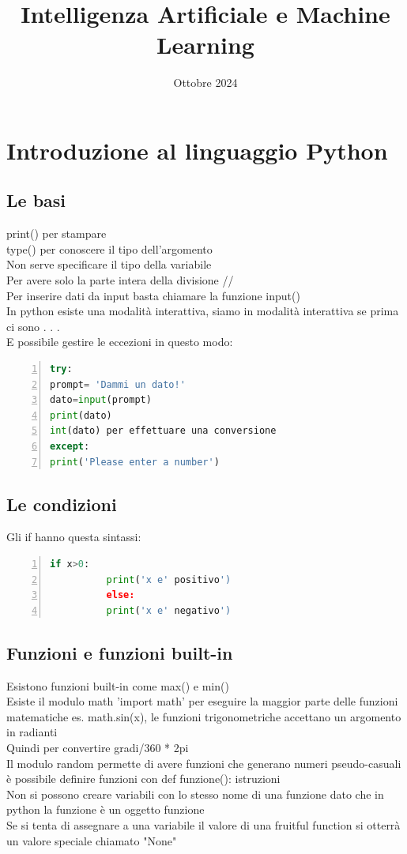\documentclass{article}
\title{Intelligenza Artificiale e Machine Learning}
\date{Ottobre 2024}
\begin{document}
\maketitle

\section{Introduzione al linguaggio Python}
\subsection{Le basi}
print() per stampare\\
           type() per conoscere il tipo dell'argomento\\
           Non serve specificare il tipo della variabile\\
           Per avere solo la parte intera della divisione //\\
           Per inserire dati da input basta chiamare la funzione input()\\
           In python esiste una modalità interattiva, siamo in modalità interattiva se prima ci sono . . .\\
           E possibile gestire le eccezioni in questo modo:
           \begin{lstlisting}[language=Python, frame=single, numbers=left, caption=Esempio di eccezioni in codice Python]
try:
prompt= 'Dammi un dato!'
dato=input(prompt)
print(dato)
int(dato) per effettuare una conversione
except:
print('Please enter a number')
\end{lstlisting}

\subsection{Le condizioni}
Gli if hanno questa sintassi:
\begin{lstlisting}[language=Python, frame=single, numbers=left, caption=Esempio di condizioni in codice Python]
     if x>0: 
          print('x e' positivo')
          else:
          print('x e' negativo')
\end{lstlisting}
\subsection{Funzioni e funzioni built-in}
Esistono funzioni built-in come max() e min()\\
Esiste il modulo math 'import math' per eseguire la maggior parte delle funzioni matematiche es. math.sin(x), le funzioni trigonometriche accettano un argomento in radianti\\
Quindi per convertire gradi/360 * 2pi\\
Il modulo random permette di avere funzioni che generano numeri pseudo-casuali\\
è possibile definire funzioni con def funzione(): istruzioni\\
Non si possono creare variabili con lo stesso nome di una funzione dato che in python la funzione è un oggetto funzione\\
Se si tenta di assegnare a una variabile il valore di una fruitful function si otterrà un valore speciale chiamato "None"\\
\end{document}
